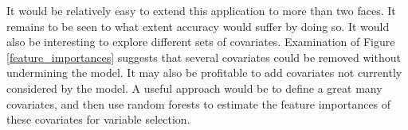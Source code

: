 \documentclass[10pt,a4paper]{article}
\begin{document}
It would be relatively easy to extend this application to more than two faces. It remains to be seen to what extent accuracy would suffer by doing so. It would also be interesting to explore different sets of covariates. Examination of Figure \ref{feature_importances} suggests that several covariates could be removed without undermining the model. It may also be profitable to add covariates not currently considered by the model. A useful approach would be to define a great many covariates, and then use random forests to estimate the feature importances of these covariates for variable selection.



\end{document}
